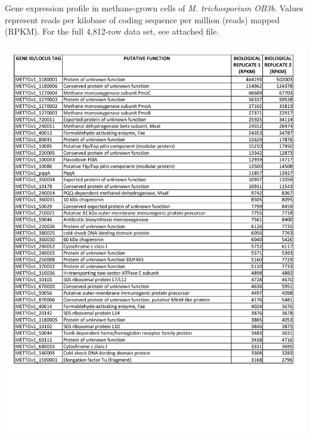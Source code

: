 \begin{table}[H]
\begin{singlespace}
\caption[Methane-grown \textit{M. trichosporium OB3b} gene expression table (RPKM)]{
	Gene expression profile in methane-grown cells of \textit{M. trichosporium OB3b}.
	Values represent reads per kilobase of coding sequence per million (reads) mapped (RPKM).
	For the full 4,812-row data set, see attached file.}
\label{table:ChA_S2}
\includegraphics[width=1.0\textwidth]{./tex/chapter1/figures/supplemental/TableS2a.pdf}
\end{singlespace}
\end{table}

